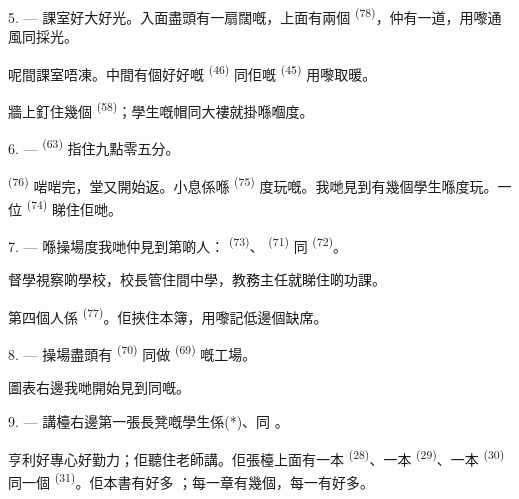 5. --- 課室好大好光。入面盡頭有一扇闊嘅，上面有兩個
\textsuperscript{(78)}，仲有一道，用嚟通風同採光。

呢間課室唔凍。中間有個好好嘅 \textsuperscript{(46)} 同佢嘅
 \textsuperscript{(45)} 用嚟取暖。

牆上釘住幾個 \textsuperscript{(58)}；學生嘅帽同大褸就掛喺嗰度。

\VUsaut{5.2mm}
\VUsaut{3.6mm}

6. ---  \textsuperscript{(63)} 指住九點零五分。

 \textsuperscript{(76)} 啱啱完，堂又開始返。小息係喺
\textsuperscript{(75)} 度玩嘅。我哋見到有幾個學生喺度玩。一位
\textsuperscript{(74)} 睇住佢哋。

7. --- 喺操場度我哋仲見到第啲人： \textsuperscript{(73)}、
 \textsuperscript{(71)} 同 \textsuperscript{(72)}。

督學視察啲學校，校長管住間中學，教務主任就睇住啲功課。

第四個人係 \textsuperscript{(77)}。佢挾住本簿，用嚟記低邊個缺席。

8. --- 操場盡頭有 \textsuperscript{(70)} 同做
\textsuperscript{(69)} 嘅工場。

圖表右邊我哋開始見到同嘅。


\VUsaut{2.4mm}

\VUsaut{3.0mm}

9. --- 講檯右邊第一張長凳嘅學生係(*)、同
。

亨利好專心好勤力；佢聽住老師講。佢張檯上面有一本
\textsuperscript{(28)}、一本 \textsuperscript{(29)}、一本
\textsuperscript{(30)} 同一個 \textsuperscript{(31)}。佢本書有好多
；每一章有幾個，每一有好多。

